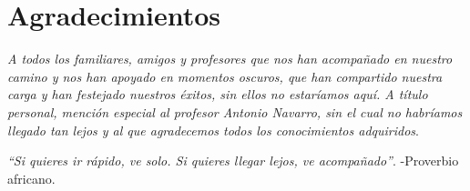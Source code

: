 

\chapter*{Agradecimientos}
    
    
    \textit{A todos los familiares, amigos y profesores que nos han acompañado en nuestro camino y nos han apoyado en momentos oscuros, que han compartido nuestra carga y han festejado nuestros éxitos, sin ellos no estaríamos aquí.
    A título personal, mención especial al profesor Antonio Navarro, sin el cual no habríamos llegado tan lejos y al que agradecemos todos los conocimientos adquiridos}.
    \newline
    
     \textit{“Si quieres ir rápido, ve solo. Si quieres llegar lejos, ve acompañado”}.
    \newline
    -Proverbio africano.